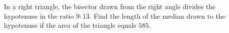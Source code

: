 In a right triangle, the bisector drawn from the right angle divides the hypotenuse in the ratio $9:13$. Find the length of the median drawn to the hypotenuse if the area of the triangle equals $585$.
